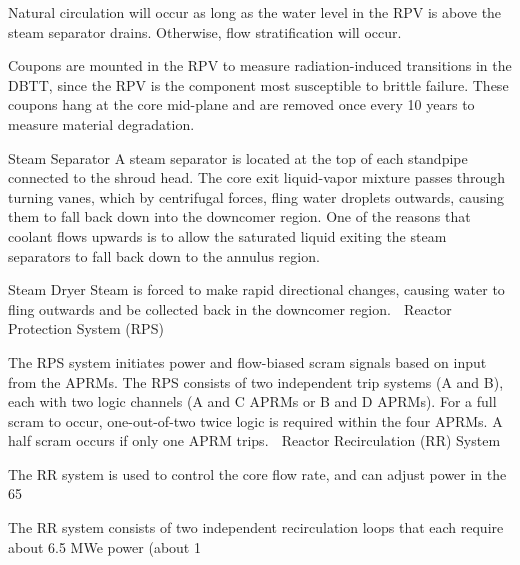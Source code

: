 \documentclass[10pt]{article}
\begin{document}
Natural circulation will occur as long as the water level in the RPV is above the steam separator drains. Otherwise, flow stratification will occur. 

Coupons are mounted in the RPV to measure radiation-induced transitions in the DBTT, since the RPV is the component most susceptible to brittle failure. These coupons hang at the core mid-plane and are removed once every 10 years to measure material degradation. 

Steam Separator
A steam separator is located at the top of each standpipe connected to the shroud head. The core exit liquid-vapor mixture passes through turning vanes, which by centrifugal forces, fling water droplets outwards, causing them to fall back down into the downcomer region. One of the reasons that coolant flows upwards is to allow the saturated liquid exiting the steam separators to fall back down to the annulus region. 

Steam Dryer
Steam is forced to make rapid directional changes, causing water to fling outwards and be collected back in the downcomer region. 
Reactor Protection System (RPS)

The RPS system initiates power and flow-biased scram signals based on input from the APRMs. The RPS consists of two independent trip systems (A and B), each with two logic channels (A and C APRMs or B and D APRMs). For a full scram to occur, one-out-of-two twice logic is required within the four APRMs. A half scram occurs if only one APRM trips. 
Reactor Recirculation (RR) System

The RR system is used to control the core flow rate, and can adjust power in the 65%

The RR system consists of two independent recirculation loops that each require about 6.5 MWe power (about 1%
\end{document}
